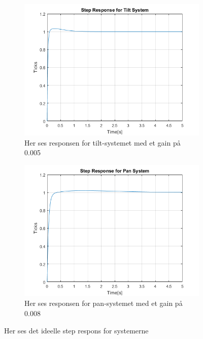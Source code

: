 \begin{figure}[t!]
    \centering
    \begin{subfigure}[t]{0.49\textwidth}
     \centering
        \includegraphics[width=1\textwidth]{Billeder/Ideal_Response_Tilt.png}
        \caption{Her ses responsen for tilt-systemet med et gain på 0.005}
        \label{fig:Ideal_Response_Tilt}
    \end{subfigure}
    \begin{subfigure}[t]{0.49\textwidth}
     \centering
        \includegraphics[width=1\textwidth]{Billeder/Ideal_Response_Pan.PNG}
        \caption{Her ses responsen for pan-systemet med et gain på 0.008}
        \label{fig:Ideal_Response_Pan}
    \end{subfigure}
    \caption{Her ses det ideelle step respons for systemerne}
\end{figure}


